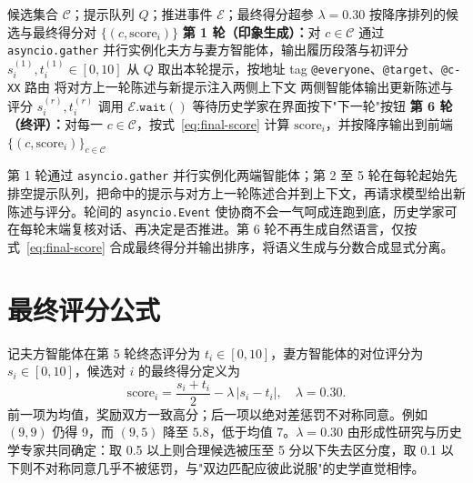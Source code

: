 \begin{algorithm}[t]
\caption{六轮多智能体协商：候选集合 \(\mathcal{C}\) 在队列年 \(t\) 的协商流程。}\label{alg:negotiation}
\begin{algorithmic}[1]
\Require 候选集合 \(\mathcal{C}\)；提示队列 \(Q\)；推进事件 \(\mathcal{E}\)；最终得分超参 \(\lambda=0.30\)
\Ensure 按降序排列的候选与最终得分对 \(\{(c, \mathrm{score}_i)\}\)
\State \textbf{第 1 轮（印象生成）：}对 \(c \in \mathcal{C}\) 通过 \texttt{asyncio.gather} 并行实例化夫方与妻方智能体，输出履历段落与初评分 \(s_i^{(1)}, t_i^{(1)} \in [0,10]\)
  \State 从 \(Q\) 取出本轮提示，按地址 tag \texttt{@everyone}、\texttt{@target}、\texttt{@c-XX} 路由
  \State 将对方上一轮陈述与新提示注入两侧上下文
  \State 两侧智能体输出更新陈述与评分 \(s_i^{(r)}, t_i^{(r)}\)
  \State 调用 \(\mathcal{E}.\texttt{wait}()\) 等待历史学家在界面按下"下一轮"按钮
\EndFor
\State \textbf{第 6 轮（终评）：}对每一 \(c \in \mathcal{C}\)，按式~\eqref{eq:final-score} 计算 \(\mathrm{score}_i\)，并按降序输出到前端
\State \Return \(\{(c, \mathrm{score}_i)\}_{c \in \mathcal{C}}\)
\end{algorithmic}
\end{algorithm}

第 1 轮通过 \texttt{asyncio.gather} 并行实例化两端智能体；第 2 至 5 轮在每轮起始先排空提示队列，把命中的提示与对方上一轮陈述合并到上下文，再请求模型给出新陈述与评分。轮间的 \texttt{asyncio.Event} 使协商不会一气呵成连跑到底，历史学家可在每轮末端复核对话、再决定是否推进。第 6 轮不再生成自然语言，仅按式~\eqref{eq:final-score} 合成最终得分并输出排序，将语义生成与分数合成显式分离。

\section{最终评分公式}\label{sec:mas-score}

记夫方智能体在第 5 轮终态评分为 \(t_i \in [0,10]\)，妻方智能体的对位评分为 \(s_i \in [0,10]\)，候选对 \(i\) 的最终得分定义为
\begin{equation}\label{eq:final-score}
  \mathrm{score}_i = \frac{s_i + t_i}{2} - \lambda\,|s_i - t_i|, \quad \lambda = 0.30.
\end{equation}
前一项为均值，奖励双方一致高分；后一项以绝对差惩罚不对称同意。例如 \((9,9)\) 仍得 9，而 \((9,5)\) 降至 \(5.8\)，低于均值 7。\(\lambda=0.30\) 由形成性研究与历史学专家共同确定：取 0.5 以上则合理候选被压至 5 分以下失去区分度，取 0.1 以下则不对称同意几乎不被惩罚，与"双边匹配应彼此说服"的史学直觉相悖。

